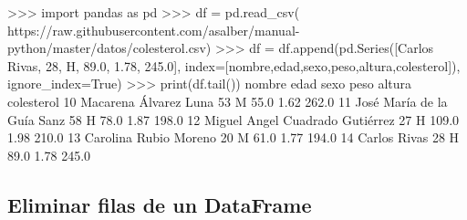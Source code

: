 \documentclass[
  spanish,
  a4paper,
]{scrreport}
\newenvironment{Shaded}{\begin{snugshade}}{\end{snugshade}}
\newcommand{\BuiltInTok}[1]{\textcolor[rgb]{0.00,0.23,0.31}{#1}}
\newcommand{\DecValTok}[1]{\textcolor[rgb]{0.68,0.00,0.00}{#1}}
\newcommand{\FloatTok}[1]{\textcolor[rgb]{0.68,0.00,0.00}{#1}}
\newcommand{\ImportTok}[1]{\textcolor[rgb]{0.00,0.46,0.62}{#1}}
\newcommand{\NormalTok}[1]{\textcolor[rgb]{0.00,0.23,0.31}{#1}}
\newcommand{\OperatorTok}[1]{\textcolor[rgb]{0.37,0.37,0.37}{#1}}
\newcommand{\StringTok}[1]{\textcolor[rgb]{0.13,0.47,0.30}{#1}}
\newcommand{\VariableTok}[1]{\textcolor[rgb]{0.07,0.07,0.07}{#1}}
\begin{document}
\begin{Shaded}
\begin{Highlighting}[]
\OperatorTok{\textgreater{}\textgreater{}\textgreater{}} \ImportTok{import}\NormalTok{ pandas }\ImportTok{as}\NormalTok{ pd}
\OperatorTok{\textgreater{}\textgreater{}\textgreater{}}\NormalTok{ df }\OperatorTok{=}\NormalTok{ pd.read\_csv(}
\StringTok{\textquotesingle{}https://raw.githubusercontent.com/asalber/manual{-}python/master/datos/colesterol.csv\textquotesingle{}}\NormalTok{)}
\OperatorTok{\textgreater{}\textgreater{}\textgreater{}}\NormalTok{ df }\OperatorTok{=}\NormalTok{ df.append(pd.Series([}\StringTok{\textquotesingle{}Carlos Rivas\textquotesingle{}}\NormalTok{, }\DecValTok{28}\NormalTok{, }\StringTok{\textquotesingle{}H\textquotesingle{}}\NormalTok{, }\FloatTok{89.0}\NormalTok{, }\FloatTok{1.78}\NormalTok{, }\FloatTok{245.0}\NormalTok{], index}\OperatorTok{=}\NormalTok{[}\StringTok{\textquotesingle{}nombre\textquotesingle{}}\NormalTok{,}\StringTok{\textquotesingle{}edad\textquotesingle{}}\NormalTok{,}\StringTok{\textquotesingle{}sexo\textquotesingle{}}\NormalTok{,}\StringTok{\textquotesingle{}peso\textquotesingle{}}\NormalTok{,}\StringTok{\textquotesingle{}altura\textquotesingle{}}\NormalTok{,}\StringTok{\textquotesingle{}colesterol\textquotesingle{}}\NormalTok{]), ignore\_index}\OperatorTok{=}\VariableTok{True}\NormalTok{)}
\OperatorTok{\textgreater{}\textgreater{}\textgreater{}} \BuiltInTok{print}\NormalTok{(df.tail())}
\NormalTok{                              nombre  edad sexo    peso  altura    colesterol}
\DecValTok{10}\NormalTok{             Macarena Álvarez Luna    }\DecValTok{53}\NormalTok{    M    }\FloatTok{55.0}    \FloatTok{1.62}         \FloatTok{262.0}
\DecValTok{11}\NormalTok{        José María de la Guía Sanz    }\DecValTok{58}\NormalTok{    H    }\FloatTok{78.0}    \FloatTok{1.87}         \FloatTok{198.0}
\DecValTok{12}\NormalTok{   Miguel Angel Cuadrado Gutiérrez    }\DecValTok{27}\NormalTok{    H   }\FloatTok{109.0}    \FloatTok{1.98}         \FloatTok{210.0}
\DecValTok{13}\NormalTok{             Carolina Rubio Moreno    }\DecValTok{20}\NormalTok{    M    }\FloatTok{61.0}    \FloatTok{1.77}         \FloatTok{194.0}
\DecValTok{14}\NormalTok{                      Carlos Rivas    }\DecValTok{28}\NormalTok{    H    }\FloatTok{89.0}    \FloatTok{1.78}         \FloatTok{245.0}
\end{Highlighting}
\end{Shaded}

\subsection{Eliminar filas de un
DataFrame}\label{eliminar-filas-de-un-dataframe}
\end{document}
